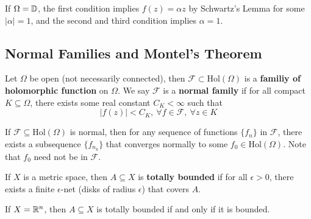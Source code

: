 \begin{remark}
    If $\Omega = \mathbb{D}$, the first condition implies $f(z) = \alpha z$ by Schwartz's Lemma for some $|\alpha| = 1$, and the second and third condition implies $\alpha = 1$.
\end{remark}

\subsection{Normal Families and Montel's Theorem}

\begin{definition}
    Let $\Omega$ be open (not necessarily connected), then $\mathcal{F} \subset \text{Hol}(\Omega)$ is a \textbf{familiy of holomorphic function} on $\Omega$. We say $\mathcal{F}$ is a \textbf{normal family} if for all compact $K \subseteq \Omega$, there exists some real constant $C_K < \infty$ such that
    \[|f(z)| < C_K,\ \forall f \in \mathcal{F},\ \forall z \in K\]
\end{definition}

\begin{theorem}
    If $\mathcal{F} \subseteq \text{Hol}(\Omega)$ is normal, then for any sequence of functions $\{f_n\}$ in $\mathcal{F}$, there exists a subsequence $\{f_{n_k}\}$ that converges normally to some $f_0 \in \text{Hol}(\Omega)$. Note that $f_0$ need not be in $\mathcal{F}$.
\end{theorem}

\begin{definition}
    If $X$ is a metric space, then $A \subseteq X$ is \textbf{totally bounded} if for all $\epsilon > 0$, there exists a finite $\epsilon$-net (disks of radius $\epsilon$) that covers $A$.
\end{definition}

\begin{proposition}
    If $X = \mathbb{R}^n$, then $A \subseteq X$ is totally bounded if and only if it is bounded.
\end{proposition}

